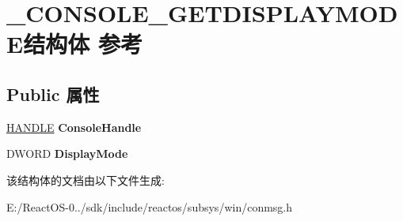 \hypertarget{struct___c_o_n_s_o_l_e___g_e_t_d_i_s_p_l_a_y_m_o_d_e}{}\section{\+\_\+\+C\+O\+N\+S\+O\+L\+E\+\_\+\+G\+E\+T\+D\+I\+S\+P\+L\+A\+Y\+M\+O\+D\+E结构体 参考}
\label{struct___c_o_n_s_o_l_e___g_e_t_d_i_s_p_l_a_y_m_o_d_e}
\subsection*{Public 属性}
\begin{DoxyCompactItemize}
\item 
\mbox{\label{struct___c_o_n_s_o_l_e___g_e_t_d_i_s_p_l_a_y_m_o_d_e_ad3012781622429ff2a5049ad7e42eebc}} 
\hyperlink{interfacevoid}{H\+A\+N\+D\+LE} {\bfseries Console\+Handle}
\item 
\mbox{\label{struct___c_o_n_s_o_l_e___g_e_t_d_i_s_p_l_a_y_m_o_d_e_ae56d096bee9ced786bfc44705249b9a1}} 
D\+W\+O\+RD {\bfseries Display\+Mode}
\end{DoxyCompactItemize}


该结构体的文档由以下文件生成\+:\begin{DoxyCompactItemize}
\item 
E\+:/\+React\+O\+S-\/0../sdk/include/reactos/subsys/win/conmsg.\+h\end{DoxyCompactItemize}
